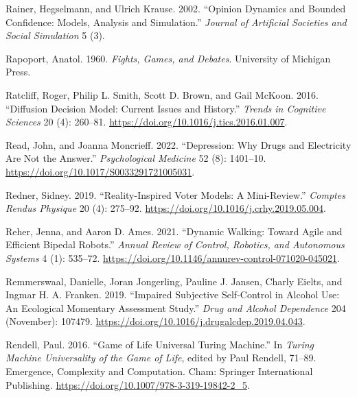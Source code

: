 \documentclass[
  a4paper,
  DIV=11,
  numbers=noendperiod,
  oneside]{scrreprt}
\newlength{\cslhangindent}
\newenvironment{CSLReferences}[2] %
 {\begin{list}{}{%
  \setlength{\itemindent}{0pt}
  \setlength{\leftmargin}{0pt}
  \setlength{\parsep}{0pt}
  \ifodd #1
   \setlength{\leftmargin}{\cslhangindent}
   \setlength{\itemindent}{-1\cslhangindent}
  \fi
  \setlength{\itemsep}{#2\baselineskip}}}
 {\end{list}}
\begin{document}
\begin{CSLReferences}{1}{0}
Rainer, Hegselmann, and Ulrich Krause. 2002. {``Opinion {Dynamics} and
{Bounded Confidence}: {Models}, {Analysis} and {Simulation}.''}
\emph{Journal of Artificial Societies and Social Simulation} 5 (3).

Rapoport, Anatol. 1960. \emph{Fights, {Games}, and {Debates}}.
{University of Michigan Press}.

Ratcliff, Roger, Philip L. Smith, Scott D. Brown, and Gail McKoon. 2016.
{``Diffusion {Decision Model}: {Current Issues} and {History}.''}
\emph{Trends in Cognitive Sciences} 20 (4): 260--81.
\url{https://doi.org/10.1016/j.tics.2016.01.007}.

Read, John, and Joanna Moncrieff. 2022. {``Depression: Why Drugs and
Electricity Are Not the Answer.''} \emph{Psychological Medicine} 52 (8):
1401--10. \url{https://doi.org/10.1017/S0033291721005031}.

Redner, Sidney. 2019. {``Reality-Inspired Voter Models: {A}
Mini-Review.''} \emph{Comptes Rendus Physique} 20 (4): 275--92.
\url{https://doi.org/10.1016/j.crhy.2019.05.004}.

Reher, Jenna, and Aaron D. Ames. 2021. {``Dynamic {Walking}: {Toward
Agile} and {Efficient Bipedal Robots}.''} \emph{Annual Review of
Control, Robotics, and Autonomous Systems} 4 (1): 535--72.
\url{https://doi.org/10.1146/annurev-control-071020-045021}.

Remmerswaal, Danielle, Joran Jongerling, Pauline J. Jansen, Charly
Eielts, and Ingmar H. A. Franken. 2019. {``Impaired Subjective
Self-Control in Alcohol Use: {An} Ecological Momentary Assessment
Study.''} \emph{Drug and Alcohol Dependence} 204 (November): 107479.
\url{https://doi.org/10.1016/j.drugalcdep.2019.04.043}.

Rendell, Paul. 2016. {``Game of {Life Universal Turing Machine}.''} In
\emph{Turing {Machine Universality} of the {Game} of {Life}}, edited by
Paul Rendell, 71--89. Emergence, {Complexity} and {Computation}. {Cham}:
{Springer International Publishing}.
\url{https://doi.org/10.1007/978-3-319-19842-2_5}.


\end{CSLReferences}
\end{document}
